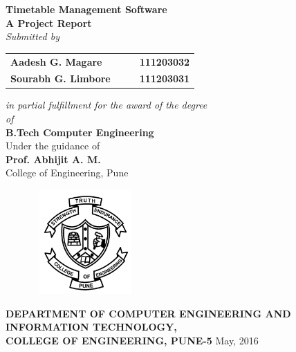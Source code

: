 \begin{titlepage}
\begin{center}
\LARGE{\bf{Timetable Management Software\\}}	%
\Large{\bf{A Project Report\\}}		%
\Large{\em{Submitted by\\}}
\begin{table}[htbp]
	\begin{center}
	\begin{tabular}{ l c c l }
	\Large\bf{Aadesh G. Magare} & & & \Large\bf{111203032} \\[0.3cm] 
	\Large\bf{Sourabh G. Limbore} & & & \Large\bf{111203031} \\
	\end{tabular}
	\end{center}
	\end{table}
\Large{\em{in partial fulfillment for the award of the degree\\ \vspace{1.5pt}of\\}}
\LARGE{\bf{B.Tech Computer Engineering\\}}%
\Large{Under the guidance of\\ }
\Large{\bf{Prof. Abhijit A. M.}\\}
\Large{College of Engineering, Pune\\}

\vspace{25pt}
\begin{figure}[h]
\centering
\includegraphics[width=4cm,height=4cm]{coep_logo.jpg}
\end{figure}
\Large{\bf{DEPARTMENT OF COMPUTER ENGINEERING AND \\INFORMATION TECHNOLOGY,\\ 
COLLEGE OF ENGINEERING, PUNE-5}}
\vfill
\large{May, 2016}
\end{center}
\end{titlepage}
